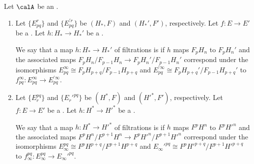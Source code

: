 \begin{definition} \label{definition:compatible_with_a_morphism_between_spectral_sequences_in_an_abelian_category_for_filtered_objects_that_the_spectral_sequences_weakly_converge_to}
   Let $\calA$ be an . 
   \begin{enumerate}
    \item Let $\{E_{pq}^r\}$ and $\{E_{pq}^{'r}\}$ be   $(H_*, F)$ and $(H_*', F')$, respectively. Let $f: E \to E'$ be a . Let $h: H_* \to H_*'$ be a .
    
    We say that a map $h: H_* \to H_*'$ of filtrations is  if $h$ maps $F_p H_n$ to $F_p H_n'$ and the associated maps $F_p H_n / F_{p-1} H_n \to F_p H_n' / F_{p-1} H_n'$ correspond under the isomorphisms $E_{pq}^\infty \cong F_p H_{p+q} / F_{p-1} H_{p+q}$  and $E_{pq}^{' \infty} \cong F_p H_{p+q}' / F_{p-1} H_{p+q}'$ to $f_{pq}^\infty: E_{pq}^\infty \to E_{pq}^{'\infty}$.


    \item Let $\{E_r^{pq}\}$ and $\{E_r'^{pq}\}$ be   $(H^*, F)$ and $(H'^*, F')$, respectively. Let $f: E \to E'$ be a . Let $h: H^* \to H'^*$ be a .

    We say that a map $h: H^* \to H'^*$ of filtrations is  if $h$ maps $F^p H^n$ to $F^p H'^n$ and the associated maps $F^p H^n / F^{p+1} H^n \to F^p H'^n / F^{p+1} H'^n$ correspond under the isomorphisms $E_\infty^{pq} \cong F^p H^{p+q} / F^{p+1} H^{p+q}$ and $E_\infty'^{pq} \cong F^p H'^{p+q} / F^{p+1} H'^{p+q}$ to $f_\infty^{pq}: E_\infty^{pq} \to E_\infty'^{pq}$.
   \end{enumerate}
\end{definition}